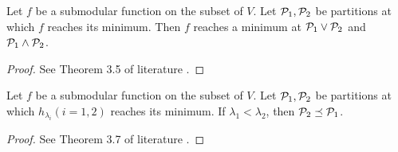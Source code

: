 \begin{theorem}\label{thm:lattice_structure}
Let $f$ be a submodular function on the subset of $V$. Let $\P_1, \P_2$ be partitions
at which $f$ reaches its minimum. Then $f$ reaches a minimum at $\P_1 \vee \P_2$ and $\P_1 \wedge \P_2$.
\end{theorem}
\begin{proof}
See Theorem 3.5 of literature \cite{psp}.	
\end{proof}
\begin{theorem}\label{thm:hierarchical}
Let $f$ be a submodular function on the subset of $V$. Let $\P_1, \P_2$ be partitions
at which $h_{\lambda_i}(i=1,2)$ reaches its minimum. 
If $\lambda_1 < \lambda_2$, then $\P_2 \preceq \P_1$.
\end{theorem}
\begin{proof}
	See Theorem 3.7 of literature \cite{psp}.	
\end{proof}
